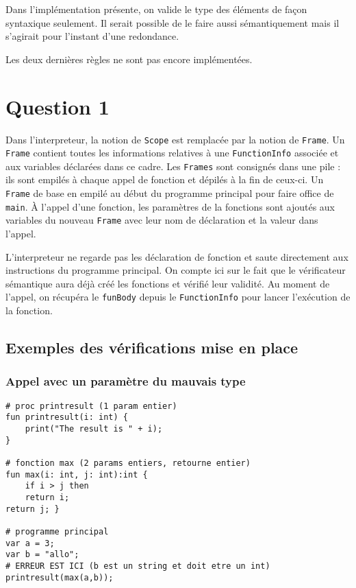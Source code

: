\documentclass[fleqn]{article}
\begin{document}
    \bigskip
    Dans l'implémentation présente, on valide le type des éléments de façon syntaxique seulement.
    Il serait possible de le faire aussi sémantiquement mais il s'agirait pour l'instant d'une redondance.
    
    \bigskip
    Les deux dernières règles ne sont pas encore implémentées.
 
    \section*{Question 1}

    Dans l'interpreteur, la notion de \verb'Scope' est remplacée par la notion de \verb'Frame'. Un \verb'Frame' contient toutes les informations relatives à une \verb'FunctionInfo' associée et aux variables déclarées dans ce cadre. Les \verb'Frames' sont consignés dans une pile : ils sont empilés à chaque appel de fonction et dépilés à la fin de ceux-ci. Un \verb'Frame' de base en empilé au début du programme principal pour faire office de \verb'main'. À l'appel d'une fonction, les paramètres de la fonctions sont ajoutés aux variables du nouveau \verb'Frame' avec leur nom de déclaration et la valeur dans l'appel. 
    \bigskip

    L'interpreteur ne regarde pas les déclaration de fonction et saute directement aux instructions du programme principal. On compte ici sur le fait que le vérificateur sémantique aura déjà créé les fonctions et vérifié leur validité. Au moment de l'appel, on récupéra le \verb'funBody' depuis le \verb'FunctionInfo' pour lancer l'exécution de la fonction.

    \subsection*{Exemples des vérifications mise en place}

    \subsubsection*{Appel avec un paramètre du mauvais type}
    \begin{lstlisting}
# proc printresult (1 param entier)
fun printresult(i: int) {
    print("The result is " + i);
}

# fonction max (2 params entiers, retourne entier)
fun max(i: int, j: int):int {
    if i > j then
    return i;
return j; }

# programme principal
var a = 3;
var b = "allo";
# ERREUR EST ICI (b est un string et doit etre un int)
printresult(max(a,b));
    \end{lstlisting}
\end{document}
